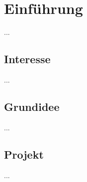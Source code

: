 %
%


\chapter{Einführung}
\label{Einführung}

...
\\



\section{Interesse}

...
\\



\section{Grundidee}

...
\\



\section{Projekt}

...
\\

